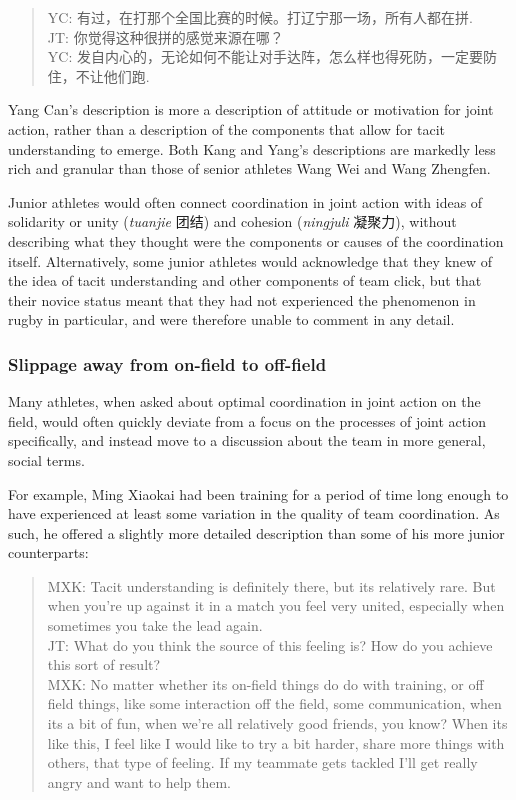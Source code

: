 \begin{CJK}{UTF8}{gbsn}
    \begin{quote}
      YC: 有过，在打那个全国比赛的时候。打辽宁那一场，所有人都在拼.\\
      JT: 你觉得这种很拼的感觉来源在哪？\\
      YC: 发自内心的，无论如何不能让对手达阵，怎么样也得死防，一定要防住，不让他们跑.
    \end{quote}

Yang Can's description is more a description of attitude or motivation for joint action, rather than a description of the components that allow for tacit understanding to emerge.  Both Kang and Yang's descriptions are markedly less rich and granular than those of senior athletes Wang Wei and Wang Zhengfen.

Junior athletes would often connect coordination in joint action with ideas of solidarity or unity (\textit{tuanjie} 团结) and cohesion (\textit{ningjuli} 凝聚力), without describing what they thought were the components or causes of the coordination itself.  Alternatively, some junior athletes would acknowledge that they knew of the idea of tacit understanding and other components of team click, but that their novice status meant that they had not experienced the phenomenon in rugby in particular, and were therefore unable to comment in any detail.







\subsubsection{Slippage away from on-field to off-field}

Many athletes, when asked about optimal coordination in joint action on the field, would often quickly deviate from a focus on the processes of joint action specifically, and instead move to a discussion about the team in more general, social terms.

For example, Ming Xiaokai had been training for a period of time long enough to have experienced at least some variation in the quality of team coordination.  As such, he offered a slightly more detailed description than some of his more junior counterparts:

    \begin{quote}
        MXK: Tacit understanding is definitely there, but its relatively rare. But when you’re up against it in a match you feel very united, especially when sometimes you take the lead again. \\
        JT: What do you think the source of this feeling is?  How do you achieve this sort of result? \\
        MXK: No matter whether its on-field things do do with training, or off field things, like some interaction off the field, some communication, when its a bit of fun, when we're all relatively good friends, you know?  When its like this, I feel like I would like to try a bit harder, share more things with others, that type of feeling.  If my teammate gets tackled I'll get really angry and want to help them.
    \end{quote}


\end{CJK}
